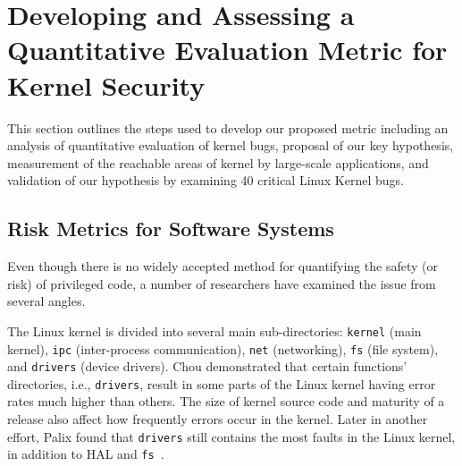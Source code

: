 \section{Developing and Assessing a Quantitative Evaluation Metric for Kernel Security}
\label{sec.metric}



This section outlines the steps used to develop our proposed metric including
an analysis of quantitative evaluation of kernel bugs, proposal of our key hypothesis,
measurement of the reachable areas of kernel by large-scale applications,
and validation of our hypothesis by examining 40 critical Linux Kernel bugs.

\subsection{Risk Metrics for Software Systems}

Even though there is no widely accepted method for
quantifying the safety (or risk) of privileged code, a number of researchers have
examined the issue from several angles.


The Linux kernel is divided into several main sub-directories:
\texttt{kernel} (main kernel), \texttt{ipc} (inter-process communication),
\texttt{net} (networking), \texttt{fs} (file system), and \texttt{drivers} (device drivers).
Chou \cite{PittSFIeld} demonstrated that certain functions' directories, i.e., \texttt{drivers},
result in some parts of the Linux kernel having error rates much higher than others.
The size of kernel source code and maturity of a release also affect how frequently errors occur in the kernel.
Later in another effort, Palix found that \texttt{drivers} still contains the most faults in
the Linux kernel, in addition to HAL and \texttt{fs}~\cite{palix2011faults}.

